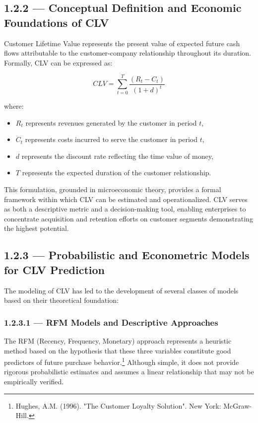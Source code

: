 \documentclass[12pt,a4paper,oneside]{report}
\begin{document}
\subsection{1.2.2 — Conceptual Definition and Economic Foundations of CLV}

Customer Lifetime Value represents the present value of expected future cash flows attributable to the customer-company relationship throughout its duration. Formally, CLV can be expressed as:

\begin{equation}
CLV = \sum_{t=0}^{T} \frac{(R_t - C_t)}{(1+d)^t}
\label{eq:clv_general}
\end{equation}

where:
\begin{itemize}
\item $R_t$ represents revenues generated by the customer in period $t$,
\item $C_t$ represents costs incurred to serve the customer in period $t$,
\item $d$ represents the discount rate reflecting the time value of money,
\item $T$ represents the expected duration of the customer relationship.
\end{itemize}

This formulation, grounded in microeconomic theory, provides a formal framework within which CLV can be estimated and operationalized. CLV serves as both a descriptive metric and a decision-making tool, enabling enterprises to concentrate acquisition and retention efforts on customer segments demonstrating the highest potential.

\subsection{1.2.3 — Probabilistic and Econometric Models for CLV Prediction}

The modeling of CLV has led to the development of several classes of models based on their theoretical foundation:

\subsubsection{1.2.3.1 — RFM Models and Descriptive Approaches}

The RFM (Recency, Frequency, Monetary) approach represents a heuristic method based on the hypothesis that these three variables constitute good predictors of future purchase behavior.\footnote{Hughes, A.M. (1996). "The Customer Loyalty Solution". New York: McGraw-Hill.} Although simple, it does not provide rigorous probabilistic estimates and assumes a linear relationship that may not be empirically verified.
\end{document}
